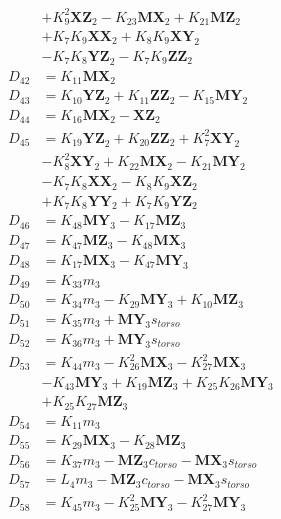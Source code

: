 \begin{multicols}{2}
\begin{align}
&+ K_{9}^2\mathbf{XZ}_2 - K_{23}\mathbf{MX}_2 + K_{21}\mathbf{MZ}_2  \nonumber \\
&+ K_{7}K_{9}\mathbf{XX}_2 + K_{8}K_{9}\mathbf{XY}_2  \nonumber \\
&- K_{7}K_{8}\mathbf{YZ}_2 - K_{7}K_{9}\mathbf{ZZ}_2 \nonumber \\
D_{42} &= K_{11}\mathbf{MX}_2 \nonumber \\
D_{43} &= K_{10}\mathbf{YZ}_2 + K_{11}\mathbf{ZZ}_2 - K_{15}\mathbf{MY}_2 \nonumber \\
D_{44} &= K_{16}\mathbf{MX}_2 - \mathbf{XZ}_2 \nonumber \\
D_{45} &= K_{19}\mathbf{YZ}_2 + K_{20}\mathbf{ZZ}_2 + K_{7}^2\mathbf{XY}_2  \nonumber \\
&- K_{8}^2\mathbf{XY}_2 + K_{22}\mathbf{MX}_2 - K_{21}\mathbf{MY}_2  \nonumber \\
&- K_{7}K_{8}\mathbf{XX}_2 - K_{8}K_{9}\mathbf{XZ}_2  \nonumber \\
&+ K_{7}K_{8}\mathbf{YY}_2 + K_{7}K_{9}\mathbf{YZ}_2 \nonumber \\
D_{46} &= K_{48}\mathbf{MY}_3 - K_{17}\mathbf{MZ}_3 \nonumber \\
D_{47} &= K_{47}\mathbf{MZ}_3 - K_{48}\mathbf{MX}_3 \nonumber \\
D_{48} &= K_{17}\mathbf{MX}_3 - K_{47}\mathbf{MY}_3 \nonumber \\
D_{49} &= K_{33}m_3 \nonumber \\
D_{50} &= K_{34}m_3 - K_{29}\mathbf{MY}_3 + K_{10}\mathbf{MZ}_3 \nonumber \\
D_{51} &= K_{35}m_3 + \mathbf{MY}_3s_{torso} \nonumber \\
D_{52} &= K_{36}m_3 + \mathbf{MY}_3s_{torso} \nonumber \\
D_{53} &= K_{44}m_3 - K_{26}^2\mathbf{MX}_3 - K_{27}^2\mathbf{MX}_3  \nonumber \\
&- K_{43}\mathbf{MY}_3 + K_{19}\mathbf{MZ}_3 + K_{25}K_{26}\mathbf{MY}_3  \nonumber \\
&+ K_{25}K_{27}\mathbf{MZ}_3 \nonumber \\
D_{54} &= K_{11}m_3 \nonumber \\
D_{55} &= K_{29}\mathbf{MX}_3 - K_{28}\mathbf{MZ}_3 \nonumber \\
D_{56} &= K_{37}m_3 - \mathbf{MZ}_3c_{torso} - \mathbf{MX}_3s_{torso} \nonumber \\
D_{57} &= L_4m_3 - \mathbf{MZ}_3c_{torso} - \mathbf{MX}_3s_{torso} \nonumber \\
D_{58} &= K_{45}m_3 - K_{25}^2\mathbf{MY}_3 - K_{27}^2\mathbf{MY}_3  \nonumber \\

\end{align}
\end{multicols}

